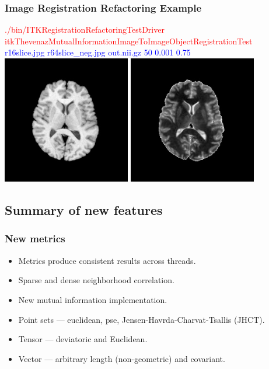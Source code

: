 \begin{frame}
\frametitle{Image Registration Refactoring Example}
\textcolor{red}{./bin/ITKRegistrationRefactoringTestDriver itkThevenazMutualInformationImageToImageObjectRegistrationTest }\\
\textcolor{blue}{r16slice.jpg r64slice\_neg.jpg out.nii.gz  50 0.001 0.75 }\\
\includegraphics[height=2.2in]{../Art/r16slice.jpg}
\includegraphics[height=2.2in]{../Art/r64slice_neg_to_16.jpg}
\end{frame}

\subsection{Summary of new features}

\begin{frame}
\frametitle{New metrics}
\Large
\begin{itemize}
\item Metrics produce consistent results across threads.
\item Sparse and dense neighborhood correlation.
\item New mutual information implementation.
\item Point sets ---  euclidean, pse, Jensen-Havrda-Charvat-Tsallis (JHCT).
\item Tensor --- deviatoric and Euclidean.
\item Vector --- arbitrary length (non-geometric) and covariant.
\end{itemize}
\end{frame}

